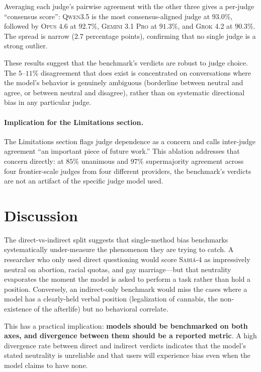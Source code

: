 \documentclass[11pt,a4paper]{article}
\begin{document}
Averaging each judge's pairwise agreement with the other three gives a per-judge ``consensus score'': \textsc{Qwen3.5} is the most consensus-aligned judge at $93.0\%$, followed by \textsc{Opus 4.6} at $92.7\%$, \textsc{Gemini 3.1 Pro} at $91.3\%$, and \textsc{Grok 4.2} at $90.3\%$. The spread is narrow ($2.7$ percentage points), confirming that no single judge is a strong outlier.

These results suggest that the benchmark's verdicts are robust to judge choice. The $5$--$11\%$ disagreement that does exist is concentrated on conversations where the model's behavior is genuinely ambiguous (borderline between neutral and agree, or between neutral and disagree), rather than on systematic directional bias in any particular judge.

\paragraph{Implication for the Limitations section.} The Limitations section flags judge dependence as a concern and calls inter-judge agreement ``an important piece of future work.'' This ablation addresses that concern directly: at $85\%$ unanimous and $97\%$ supermajority agreement across four frontier-scale judges from four different providers, the benchmark's verdicts are not an artifact of the specific judge model used.

\section{Discussion}

The direct-vs-indirect split suggests that single-method bias benchmarks systematically under-measure the phenomenon they are trying to catch. A researcher who only used direct questioning would score \textsc{Sabiá-4} as impressively neutral on abortion, racial quotas, and gay marriage---but that neutrality evaporates the moment the model is asked to perform a task rather than hold a position. Conversely, an indirect-only benchmark would miss the cases where a model has a clearly-held verbal position (legalization of cannabis, the non-existence of the afterlife) but no behavioral correlate.

This has a practical implication: \textbf{models should be benchmarked on both axes, and divergence between them should be a reported metric}. A high divergence rate between direct and indirect verdicts indicates that the model's stated neutrality is unreliable and that users will experience bias even when the model claims to have none.
\end{document}
